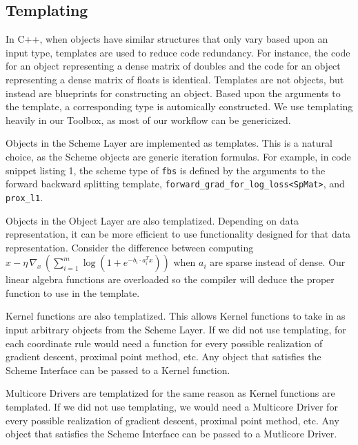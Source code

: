 \subsection{Templating}

In C++, when objects have similar structures that only vary based upon an input type, templates are used to reduce code redundancy. For instance, the code for an object representing a dense matrix of doubles and the code for an object representing a dense matrix of floats is identical.
Templates are not objects, but instead are blueprints for constructing an object.
Based upon the arguments to the template, a corresponding type is automically constructed.
We use templating heavily in our Toolbox, as most of our workflow can be genericized.

Objects in the Scheme Layer are implemented as templates.
This is a natural choice, as the Scheme objects are generic iteration formulas.
For example, in code snippet listing 1, the scheme type of \texttt{fbs} is defined by the arguments to the forward backward splitting template, \texttt{forward\_grad\_for\_log\_loss<SpMat>}, and \texttt{prox\_l1}.

Objects in the Object Layer are also templatized. Depending on data representation, it can be more efficient to use functionality designed for that data representation. Consider the difference between computing $x - \eta \, \nabla_x \,(\sum_{i = 1}^m \log (1 + e^{-b_i \cdot a_i^T x}))$ when $a_i$ are sparse instead of dense.
Our linear algebra functions are overloaded so the compiler will deduce the proper function to use in the template.

Kernel functions are also templatized. This allows Kernel functions to take in as input arbitrary objects from the Scheme Layer. If we did not use templating, for each coordinate rule would need a function for every possible realization of gradient descent, proximal point method, etc.  Any object that satisfies the Scheme Interface can be passed to a Kernel function.

Multicore Drivers are templatized for the same reason as Kernel functions are templated. If we did not use templating, we would need a Multicore Driver for every possible realization of gradient descent, proximal point method, etc. Any object that satisfies the Scheme Interface can be passed to a Mutlicore Driver.
